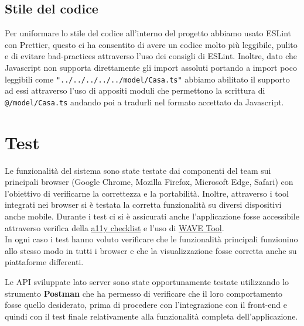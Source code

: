 \documentclass[italian]{report}
\begin{document}
\section{Stile del codice}
Per uniformare lo stile del codice all'interno del progetto abbiamo usato ESLint con Prettier, questo ci ha consentito di avere un codice molto più leggibile, pulito e di evitare bad-practices attraverso l'uso dei consigli di ESLint.
Inoltre, dato che Javascript non supporta direttamente gli import assoluti portando a import poco leggibili come \lstinline{"../../../../../model/Casa.ts"} abbiamo abilitato il supporto ad essi attraverso l'uso di appositi moduli  che permettono la scrittura di \lstinline{@/model/Casa.ts} andando poi a tradurli nel formato accettato da Javascript. 

\chapter{Test}
Le funzionalità del sistema sono state testate dai componenti del team sui principali browser (Google Chrome, Mozilla Firefox, Microsoft Edge, Safari) con l'obiettivo di verificarne la correttezza e la portabilità.
Inoltre, attraverso i tool integrati nei browser si è testata la corretta funzionalità su diversi dispositivi anche mobile. Durante i test ci si è assicurati anche l'applicazione fosse accessibile attraverso verifica della \href{https://www.a11yproject.com/checklist/}{a11y checklist} e l'uso di \href{https://wave.webaim.org}{WAVE Tool}.
\\In ogni caso i test hanno
voluto verificare che le funzionalità principali funzionino allo stesso
modo in tutti i browser e che la visualizzazione fosse corretta anche
su piattaforme differenti.

Le API sviluppate lato server sono state opportunamente testate utilizzando lo strumento \textbf{Postman} che ha permesso di verificare che il loro comportamento fosse quello desiderato, prima di procedere con l’integrazione con il
front-end e quindi con il test finale relativamente alla funzionalità completa
dell’applicazione.
\end{document}
